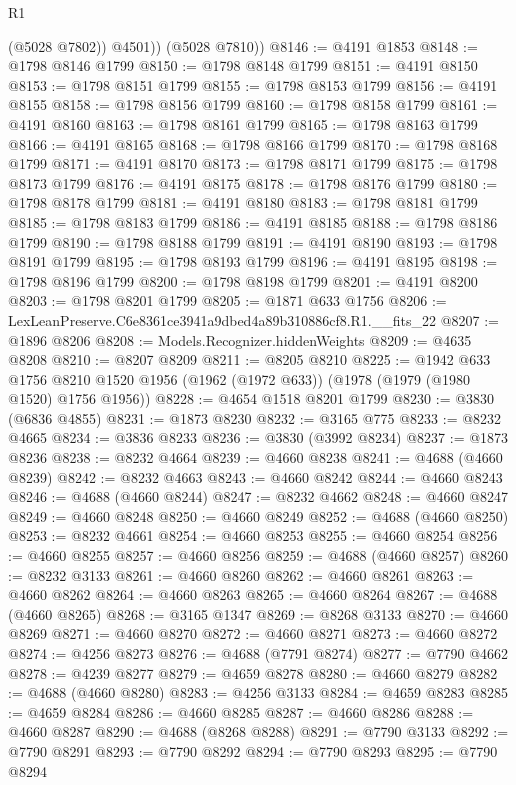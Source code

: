\begin{lexlean}{R1}
\begin{coremodule}
            (@5028 @7802))
          @4501))
      (@5028 @7810))
@8146 := @4191 @1853
@8148 := @1798 @8146 @1799
@8150 := @1798 @8148 @1799
@8151 := @4191 @8150
@8153 := @1798 @8151 @1799
@8155 := @1798 @8153 @1799
@8156 := @4191 @8155
@8158 := @1798 @8156 @1799
@8160 := @1798 @8158 @1799
@8161 := @4191 @8160
@8163 := @1798 @8161 @1799
@8165 := @1798 @8163 @1799
@8166 := @4191 @8165
@8168 := @1798 @8166 @1799
@8170 := @1798 @8168 @1799
@8171 := @4191 @8170
@8173 := @1798 @8171 @1799
@8175 := @1798 @8173 @1799
@8176 := @4191 @8175
@8178 := @1798 @8176 @1799
@8180 := @1798 @8178 @1799
@8181 := @4191 @8180
@8183 := @1798 @8181 @1799
@8185 := @1798 @8183 @1799
@8186 := @4191 @8185
@8188 := @1798 @8186 @1799
@8190 := @1798 @8188 @1799
@8191 := @4191 @8190
@8193 := @1798 @8191 @1799
@8195 := @1798 @8193 @1799
@8196 := @4191 @8195
@8198 := @1798 @8196 @1799
@8200 := @1798 @8198 @1799
@8201 := @4191 @8200
@8203 := @1798 @8201 @1799
@8205 := @1871 @633 @1756
@8206 := LexLeanPreserve.C6e8361ce3941a9dbed4a89b310886cf8.R1.__fits_22
@8207 := @1896 @8206
@8208 := Models.Recognizer.hiddenWeights
@8209 := @4635 @8208
@8210 := @8207 @8209
@8211 := @8205 @8210
@8225 := @1942
    @633
    @1756
    @8210
    @1520
    @1956
    (@1962 (@1972 @633))
    (@1978 (@1979 (@1980 @1520) @1756 @1956))
@8228 := @4654 @1518 @8201 @1799
@8230 := @3830 (@6836 @4855)
@8231 := @1873 @8230
@8232 := @3165 @775
@8233 := @8232 @4665
@8234 := @3836 @8233
@8236 := @3830 (@3992 @8234)
@8237 := @1873 @8236
@8238 := @8232 @4664
@8239 := @4660 @8238
@8241 := @4688 (@4660 @8239)
@8242 := @8232 @4663
@8243 := @4660 @8242
@8244 := @4660 @8243
@8246 := @4688 (@4660 @8244)
@8247 := @8232 @4662
@8248 := @4660 @8247
@8249 := @4660 @8248
@8250 := @4660 @8249
@8252 := @4688 (@4660 @8250)
@8253 := @8232 @4661
@8254 := @4660 @8253
@8255 := @4660 @8254
@8256 := @4660 @8255
@8257 := @4660 @8256
@8259 := @4688 (@4660 @8257)
@8260 := @8232 @3133
@8261 := @4660 @8260
@8262 := @4660 @8261
@8263 := @4660 @8262
@8264 := @4660 @8263
@8265 := @4660 @8264
@8267 := @4688 (@4660 @8265)
@8268 := @3165 @1347
@8269 := @8268 @3133
@8270 := @4660 @8269
@8271 := @4660 @8270
@8272 := @4660 @8271
@8273 := @4660 @8272
@8274 := @4256 @8273
@8276 := @4688 (@7791 @8274)
@8277 := @7790 @4662
@8278 := @4239 @8277
@8279 := @4659 @8278
@8280 := @4660 @8279
@8282 := @4688 (@4660 @8280)
@8283 := @4256 @3133
@8284 := @4659 @8283
@8285 := @4659 @8284
@8286 := @4660 @8285
@8287 := @4660 @8286
@8288 := @4660 @8287
@8290 := @4688 (@8268 @8288)
@8291 := @7790 @3133
@8292 := @7790 @8291
@8293 := @7790 @8292
@8294 := @7790 @8293
@8295 := @7790 @8294

\end{coremodule}
\end{lexlean}
